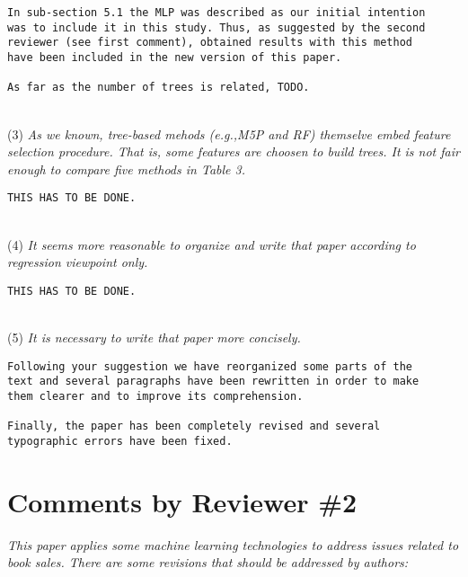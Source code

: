 \documentclass[preprint]{elsarticle}
\begin{document}
\begin{verbatim}
In sub-section 5.1 the MLP was described as our initial intention 
was to include it in this study. Thus, as suggested by the second 
reviewer (see first comment), obtained results with this method 
have been included in the new version of this paper.

As far as the number of trees is related, TODO.
\end{verbatim}

~\\
\noindent (3) \emph{As we known, tree-based mehods (e.g.,M5P and RF) themselve embed feature selection procedure. That is, some features are choosen to build trees. It is not fair enough to compare five methods in Table 3. } 

\begin{verbatim}
THIS HAS TO BE DONE.
\end{verbatim}

~\\
\noindent (4) \emph{It seems more reasonable to organize and write that paper according to regression viewpoint only. } 

\begin{verbatim}
THIS HAS TO BE DONE.
\end{verbatim}

~\\
\noindent (5) \emph{It is necessary to write that paper more concisely. } 

\begin{verbatim}
Following your suggestion we have reorganized some parts of the 
text and several paragraphs have been rewritten in order to make 
them clearer and to improve its comprehension.

Finally, the paper has been completely revised and several 
typographic errors have been fixed.
\end{verbatim}



\section{Comments by Reviewer \#2}

\noindent \emph{This paper applies some machine learning technologies to address issues related to book sales. There are some revisions that should be addressed by authors: } \\
\end{document}
